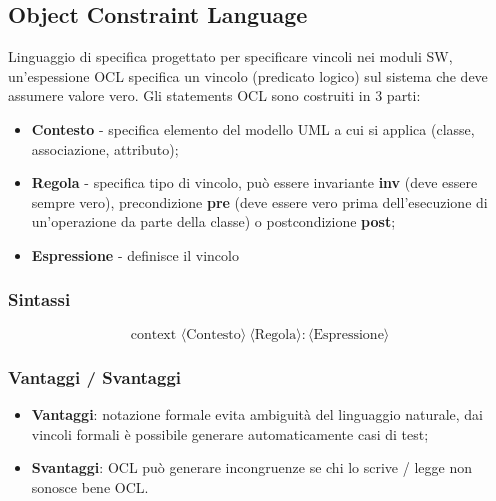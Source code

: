\documentclass{article}
\begin{document}
    \subsection{Object Constraint Language}
      Linguaggio di specifica progettato per specificare vincoli nei moduli SW, un'espessione OCL specifica un vincolo (predicato logico) sul sistema che deve assumere valore vero. Gli statements OCL sono costruiti in 3 parti:
      \begin{itemize}
        \item \textbf{Contesto} - specifica elemento del modello UML a cui si applica (classe, associazione, attributo);
        \item \textbf{Regola} - specifica tipo di vincolo, può essere invariante \textbf{inv} (deve essere sempre vero), precondizione \textbf{pre} (deve essere vero prima dell'esecuzione di un'operazione da parte della classe) o postcondizione \textbf{post};
        \item \textbf{Espressione} - definisce il vincolo
      \end{itemize}
      \subsubsection{Sintassi}
        \[
          \text{context }\langle \text{Contesto} \rangle\ \langle \text{Regola} \rangle : \langle \text{Espressione} \rangle
        \]
      \subsubsection{Vantaggi / Svantaggi}
      \begin{itemize}
        \item \textbf{Vantaggi}: notazione formale evita ambiguità del linguaggio naturale, dai vincoli formali è possibile generare automaticamente casi di test;
        \item \textbf{Svantaggi}: OCL può generare incongruenze se chi lo scrive / legge non sonosce bene OCL.
      \end{itemize}
\end{document}
